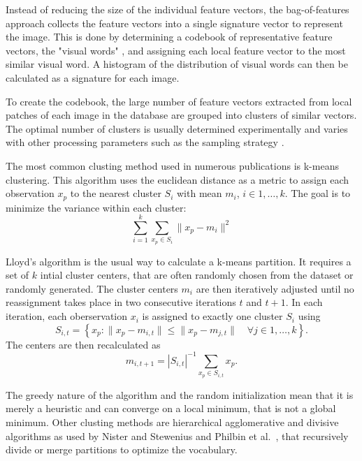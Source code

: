 Instead of reducing the size of the individual feature vectors, the
bag-of-features approach collects the feature vectors into a single signature
vector to represent the image. This is done by determining a codebook of
representative feature vectors, the "visual words" \autocite{sivic_video_2003},
and assigning each local feature vector to the most similar visual word. A
histogram of the distribution of visual words can then be calculated as a
signature for each image.

To create the codebook, the large number of feature vectors extracted from
local patches of each image in the database are grouped into clusters of
similar vectors. The optimal number of clusters is usually determined
experimentally and varies with other processing parameters such as the sampling
strategy \autocite{nowak_sampling_2006} \autocite{yang_evaluating_2007}.


The most common clusting method used in numerous publications
\autocite{zhu_theory_2002} \autocite{sivic_video_2003}
\autocite{csurka_visual_2004} \autocite{fergus_learning_2005}
\autocite{winn_object_2005} is k-means clustering. This algorithm uses the
euclidean distance as a metric to assign each observation $x_p$ to the nearest
cluster $S_i$ with mean $m_i$, $i \in 1, \dots, k$. The goal is to minimize
the variance within each cluster:
\begin{equation*}
    \sum_{i=1}^k \sum_{x_p \in S_i} \| x_p - m_i \|^2
\end{equation*}

Lloyd's algorithm is the usual way to calculate a k-means partition. It
requires a set of $k$ intial cluster centers, that are often randomly chosen
from the dataset or randomly generated. The cluster centers $m_i$ are then
iteratively adjusted until no reassignment takes place in two consecutive
iterations $t$ and $t+1$. In each iteration, each oberservation $x_i$ is
assigned to exactly one cluster $S_i$ using
\begin{equation*}
    S_{i, t} = \left\{ x_p : \| x_p - m_{i, t} \| \leq \| x_p - m_{j, t} \| \quad \forall j \in 1, \dots, k \right\}.
\end{equation*}
The centers are then recalculated as
\begin{equation*}
    m_{i, t+1} = |S_{i, t}|^{-1} \sum_{x_p \in S_{i, t}} x_p.
\end{equation*}

The greedy nature of the algorithm and the random initialization mean that it
is merely a heuristic and can converge on a local minimum, that is not a global
minimum.  Other clusting methods are hierarchical agglomerative and divisive
algorithms as used by Nister and Stewenius \autocite{nister_scalable_2006} and
Philbin et al.\ \autocite {philbin_object_2007}, that recursively divide or
merge partitions to optimize the vocabulary.

